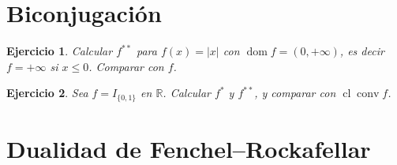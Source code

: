 \documentclass[11pt]{report}
\newtheorem{ex}{Ejercicio}
\newcommand{\R}{\mathbb{R}}
\newcommand{\dom}{\operatorname{dom}}
\newcommand{\cl}{\operatorname{cl}}
\newcommand{\indic}{I}
\newcommand{\conv}{\operatorname{conv}}
\begin{document}
\section{Biconjugación}

\begin{ex}
Calcular $f^{**}$ para $f(x)=|x|$ con $\dom f=(0,+\infty)$,
es decir $f=+\infty$ si $x\le0$. Comparar con $f$.
\end{ex}

\begin{ex}
Sea $f=\indic_{\{0,1\}}$ en $\R$. Calcular $f^*$ y $f^{**}$, y
comparar con $\cl\conv f$.
\end{ex}

\section{Dualidad de Fenchel--Rockafellar}
\end{document}
